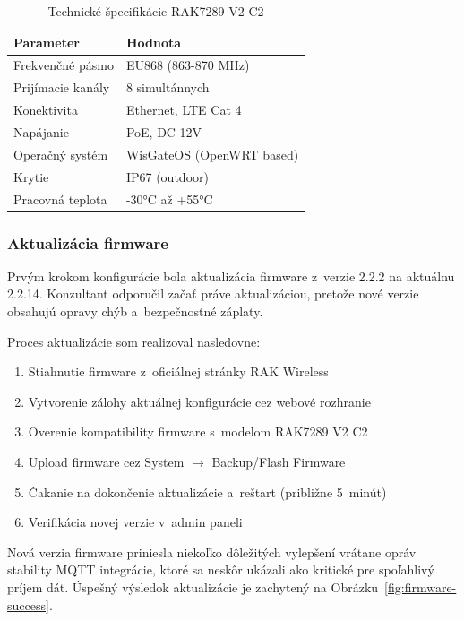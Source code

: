 \begin{table}[htbp]
    \centering
    \begin{tabular}{|l|l|}
        \hline
        \textbf{Parameter} & \textbf{Hodnota} \\
        \hline
        Frekvenčné pásmo & EU868 (863-870 MHz) \\
        Prijímacie kanály & 8 simultánnych \\
        Konektivita & Ethernet, LTE Cat 4 \\
        Napájanie & PoE, DC 12V \\
        Operačný systém & WisGateOS (OpenWRT based) \\
        Krytie & IP67 (outdoor) \\
        Pracovná teplota & -30°C až +55°C \\
        \hline
    \end{tabular}
    \caption{Technické špecifikácie RAK7289 V2 C2}
    \label{tab:gateway-specs}
\end{table}

\subsubsection{Aktualizácia firmware}

Prvým krokom konfigurácie bola aktualizácia firmware z~verzie 2.2.2 na aktuálnu 2.2.14. Konzultant odporučil začať práve aktualizáciou, pretože nové verzie obsahujú opravy chýb a~bezpečnostné záplaty.

Proces aktualizácie som realizoval nasledovne:

\begin{enumerate}
    \item Stiahnutie firmware z~oficiálnej stránky RAK Wireless
    \item Vytvorenie zálohy aktuálnej konfigurácie cez webové rozhranie
    \item Overenie kompatibility firmware s~modelom RAK7289 V2 C2
    \item Upload firmware cez System $\rightarrow$ Backup/Flash Firmware
    \item Čakanie na dokončenie aktualizácie a~reštart (približne 5~minút)
    \item Verifikácia novej verzie v~admin paneli
\end{enumerate}

Nová verzia firmware priniesla niekoľko dôležitých vylepšení vrátane opráv stability MQTT integrácie, ktoré sa neskôr ukázali ako kritické pre spoľahlivý príjem dát. Úspešný výsledok aktualizácie je zachytený na Obrázku~\ref{fig:firmware-success}.

